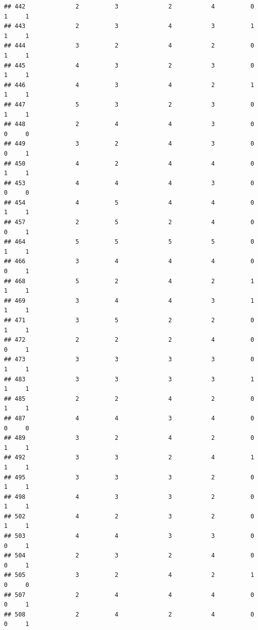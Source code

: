 \documentclass[
]{article}
\begin{document}
\begin{verbatim}
## 442              2          3              2           4          0    1     1
## 443              2          3              4           3          1    1     1
## 444              3          2              4           2          0    1     1
## 445              4          3              2           3          0    1     1
## 446              4          3              4           2          1    1     1
## 447              5          3              2           3          0    1     1
## 448              2          4              4           3          0    0     0
## 449              3          2              4           3          0    0     1
## 450              4          2              4           4          0    1     1
## 453              4          4              4           3          0    0     0
## 454              4          5              4           4          0    1     1
## 457              2          5              2           4          0    0     1
## 464              5          5              5           5          0    1     1
## 466              3          4              4           4          0    0     1
## 468              5          2              4           2          1    1     1
## 469              3          4              4           3          1    1     1
## 471              3          5              2           2          0    1     1
## 472              2          2              2           4          0    0     1
## 473              3          3              3           3          0    1     1
## 483              3          3              3           3          1    1     1
## 485              2          2              4           2          0    1     1
## 487              4          4              3           4          0    0     0
## 489              3          2              4           2          0    1     1
## 492              3          3              2           4          1    1     1
## 495              3          3              3           2          0    1     1
## 498              4          3              3           2          0    1     1
## 502              4          2              3           2          0    1     1
## 503              4          4              3           3          0    0     1
## 504              2          3              2           4          0    0     1
## 505              3          2              4           2          1    0     0
## 507              2          4              4           4          0    0     1
## 508              2          4              2           4          0    0     1

\end{verbatim}
\end{document}
